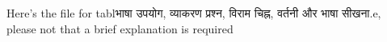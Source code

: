 Here's the file for tablभाषा उपयोग, व्याकरण प्रश्न, विराम चिह्न, वर्तनी और भाषा सीखना.e, please not that a brief explanation is required